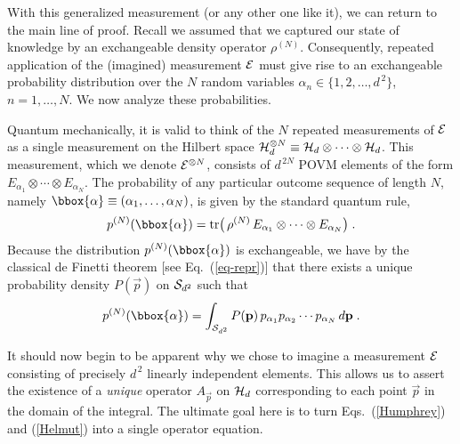 With this generalized measurement (or any other one like it), we
can return to the main line of proof.  Recall we assumed that we
captured our state of knowledge by an exchangeable density
operator $\rho^{(N)}$. Consequently, repeated application of the
(imagined) measurement $\cal E$ must give rise to an exchangeable
probability distribution over the $N$ random variables
$\alpha_n\in\{1,2,\ldots,d^{\,2}\}$, $n=1,\ldots,N$.   We now
analyze these probabilities.

Quantum mechanically, it is valid to think of the $N$ repeated
measurements of $\cal E$ as a single measurement on the Hilbert
space ${\cal H}_d^{\otimes N}\equiv {\cal
H}_d\otimes\cdots\otimes{\cal H}_d$. This measurement, which we
denote ${\cal E}^{\otimes N}$, consists of $d^{\,2N}$ POVM
elements of the form $E_{\alpha_1}\otimes\cdots\otimes
E_{\alpha_N}$. The probability of any particular outcome sequence
of length $N$, namely
$\bbox{\alpha}\equiv(\alpha_1,\ldots,\alpha_N)$, is given by the
standard quantum rule,
\begin{equation}
p^{(N)}(\bbox{\alpha})={\rm
tr}\big(\,\rho^{(N)}\,E_{\alpha_1}\otimes\cdots\otimes
E_{\alpha_N}\big)\;.
\label{Humphrey}
\end{equation}
Because the distribution $p^{(N)}(\bbox{\alpha})$ is exchangeable,
we have by the classical de Finetti theorem [see
Eq.~(\ref{eq-repr})] that there exists a unique probability
density $P(\vec{p})$ on ${\cal S}_{d^2}$ such that
\begin{equation}
p^{(N)}(\bbox{\alpha})= \int_{{\cal S}_{d^2}} P(\vec{p})\,
p_{\alpha_1} p_{\alpha_2}\cdots p_{\alpha_N}\,d\vec{p}\;.
\label{Helmut}
\end{equation}

It should now begin to be apparent why we chose to imagine a
measurement $\cal E$ consisting of precisely $d^{\,2}$ linearly
independent elements. This allows us to assert the existence of a
{\it unique\/} operator $A_{\vec{p}}$ on ${\cal H}_d$
corresponding to each point $\vec{p}$ in the domain of the
integral.  The ultimate goal here is to turn Eqs.~(\ref{Humphrey})
and (\ref{Helmut}) into a single operator equation.

